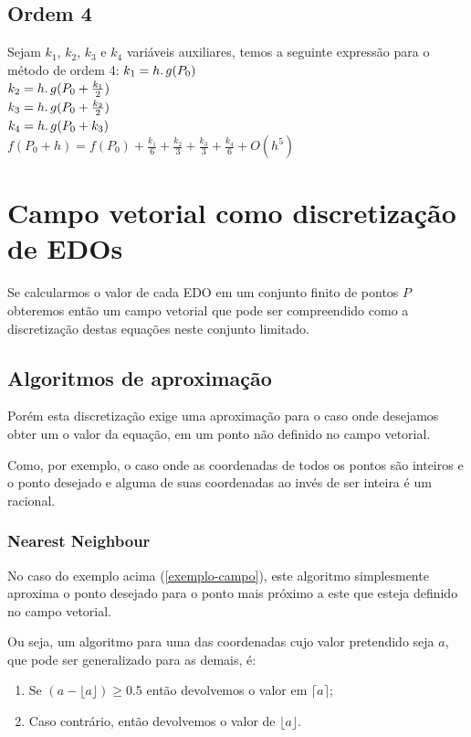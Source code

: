   \subsection{Ordem 4}
  Sejam $k_{1}$, $k_{2}$, $k_{3}$ e $k_{4}$ variáveis auxiliares, temos a seguinte expressão para o método de ordem 4:
  \newline
  \newline
  $k_{1} = h\ldotp g(P_{0})$\\
  $k_{2} = h\ldotp g(P_{0} + \frac{k_{1}}{2})$\\
  $k_{3} = h\ldotp g(P_{0} + \frac{k_{2}}{2})$\\
  $k_{4} = h\ldotp g(P_{0} + k_{3})$\\
  $f(P_{0} + h) = f(P_{0}) + \frac{k_{1}}{6} + \frac{k_{2}}{3} + \frac{k_{3}}{3} + \frac{k_{4}}{6} + O(h^{5})$

\section{Campo vetorial como discretização de EDOs}
Se calcularmos o valor de cada EDO em um conjunto finito de pontos $P$ obteremos então um campo vetorial que pode ser compreendido como a discretização destas equações neste conjunto limitado.
  \subsection{Algoritmos de aproximação}\label{aproximacao}
  Porém esta discretização exige uma aproximação para o caso onde desejamos obter um o valor da equação, em um ponto não definido no campo vetorial.

  \label{exemplo-campo}Como, por exemplo, o caso onde as coordenadas de todos os pontos são inteiros e o ponto desejado e alguma de suas coordenadas ao invés de ser inteira é um racional.

    \subsubsection{Nearest Neighbour}
    No caso do exemplo acima (\ref{exemplo-campo}), este algoritmo simplesmente aproxima o ponto desejado para o ponto mais próximo a este que esteja definido no campo vetorial.

    Ou seja, um algoritmo para uma das coordenadas cujo valor pretendido seja $a$, que pode ser generalizado para as demais, é:
    
    \begin{enumerate}
      \item Se $(a - \lfloor a\rfloor) \geq  0.5$ então devolvemos o valor em $\lceil a\rceil$;
      \item Caso contrário, então devolvemos o valor de $\lfloor a\rfloor$.
    \end{enumerate}
    

